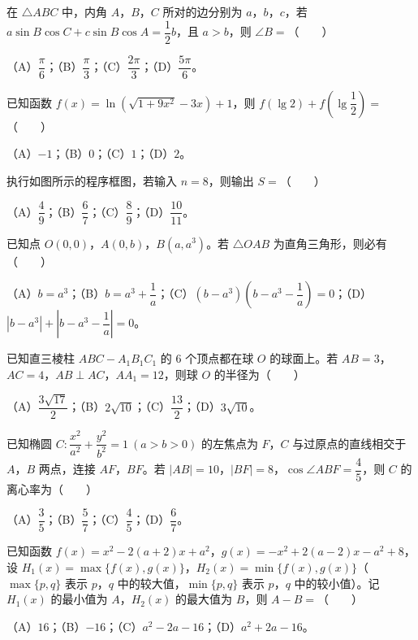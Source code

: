 \begin{question}
在 $\triangle ABC$ 中，内角 $A$，$B$，$C$ 所对的边分别为 $a$，$b$，$c$，若 $a\sin B\cos C+c\sin B\cos A=\dfrac12b$，且 $a>b$，则 $\angle B=$\mbox{（　　）}

（A）$\dfrac\pi6$；（B）$\dfrac\pi3$；（C）$\dfrac{2\pi}3$；（D）$\dfrac{5\pi}6$。

\end{question}
\begin{question}
已知函数 $f(x)=\ln\left(\sqrt{1+9x^2}-3x\right)+1$，则 $f(\lg 2)+f\left(\lg\dfrac12\right)=$\mbox{（　　）}

（A）$-1$；（B）$0$；（C）$1$；（D）$2$。

\Needspace{0.4\textheight}
\end{question}
\begin{question}
执行如图所示的程序框图，若输入 $n=8$，则输出 $S=$\mbox{（　　）}
\nopagebreak[4]
\begin{center}\end{center}
\nopagebreak[4]
（A）$\dfrac49$；（B）$\dfrac67$；（C）$\dfrac89$；（D）$\dfrac{10}{11}$。

\end{question}
\begin{question}
已知点 $O(0,0)$，$A(0,b)$，$B(a,a^3)$。若 $\triangle OAB$ 为直角三角形，则必有\mbox{（　　）}

（A）$b=a^3$；（B）$b=a^3+\dfrac1a$；（C）$(b-a^3)\left(b-a^3-\dfrac1a\right)=0$；（D）$\left|b-a^3\right|+\left|b-a^3-\dfrac1a\right|=0$。

\end{question}
\begin{question}
已知直三棱柱 $ABC-A_1B_1C_1$ 的 $6$ 个顶点都在球 $O$ 的球面上。若 $AB=3$，$AC=4$，$AB\perp AC$，$AA_1=12$，则球 $O$ 的半径为\mbox{（　　）}

（A）$\dfrac{3\sqrt{17}}2$；（B）$2\sqrt{10}$；（C）$\dfrac{13}2$；（D）$3\sqrt{10}$。

\end{question}
\begin{question}
已知椭圆 $C:\dfrac{x^2}{a^2}+\dfrac{y^2}{b^2}=1\ (a>b>0)$ 的左焦点为 $F$，$C$ 与过原点的直线相交于 $A$，$B$ 两点，连接 $AF$，$BF$。若 $|AB|=10$，$|BF|=8$，$\cos\angle ABF=\dfrac45$，则 $C$ 的离心率为\mbox{（　　）}

（A）$\dfrac35$；（B）$\dfrac57$；（C）$\dfrac45$；（D）$\dfrac67$。

\end{question}
\begin{question}
已知函数 $f(x)=x^2-2(a+2)x+a^2$，$g(x)=-x^2+2(a-2)x-a^2+8$，设 $H_1(x)=\max\{f(x),g(x)\}$，$H_2(x)=\min\{f(x),g(x)\}$（$\max\{p,q\}$ 表示 $p$，$q$ 中的较大值，$\min\{p,q\}$ 表示 $p$，$q$ 中的较小值）。记 $H_1(x)$ 的最小值为 $A$，$H_2(x)$ 的最大值为 $B$，则 $A-B=$\mbox{（　　）}

（A）$16$；（B）$-16$；（C）$a^2-2a-16$；（D）$a^2+2a-16$。

\end{question}


